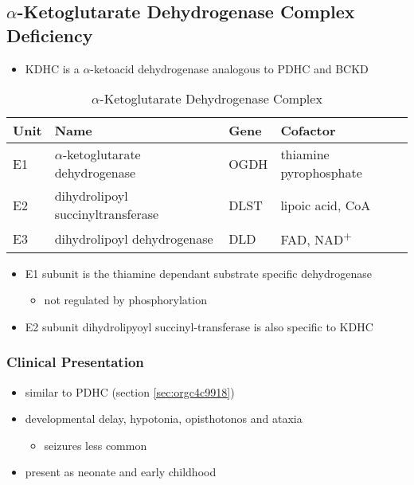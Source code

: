 \documentclass{scrartcl}
\begin{document}
\subsection{\(\alpha\)-Ketoglutarate Dehydrogenase Complex Deficiency}
\label{sec:org80d5111}
\begin{itemize}
\item KDHC is a \(\alpha\)-ketoacid dehydrogenase analogous to PDHC and BCKD
\end{itemize}


\begin{table}[htbp]
\caption{\label{tab:orgef7ad05}\(\alpha\)-Ketoglutarate Dehydrogenase Complex}
\centering
\begin{tabular}{llll}
Unit & Name & Gene & Cofactor\\
\hline
E1 & \(\alpha\)-ketoglutarate dehydrogenase & OGDH & thiamine pyrophosphate\\
E2 & dihydrolipoyl succinyltransferase & DLST & lipoic acid, CoA\\
E3 & dihydrolipoyl dehydrogenase & DLD & FAD, NAD\textsuperscript{+}\\
\end{tabular}
\end{table}

\begin{itemize}
\item E1 subunit is the thiamine dependant substrate specific dehydrogenase
\begin{itemize}
\item not regulated by phosphorylation
\end{itemize}
\item E2 subunit dihydrolipyoyl succinyl-transferase is also specific to KDHC
\end{itemize}

\subsubsection{Clinical Presentation}
\label{sec:orgc9b4b3e}
\begin{itemize}
\item similar to PDHC (section \ref{sec:orgc4c9918})
\item developmental delay, hypotonia, opisthotonos and ataxia
\begin{itemize}
\item seizures less common
\end{itemize}
\item present as neonate and early childhood
\end{itemize}
\end{document}
